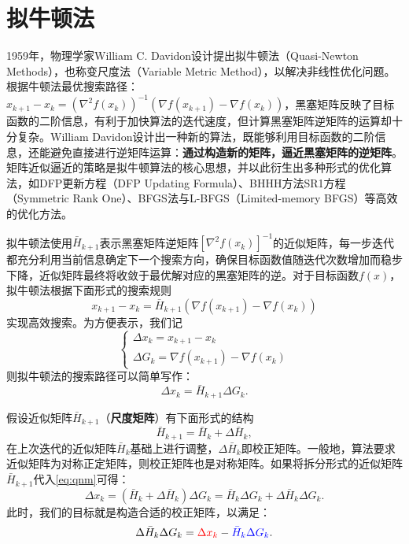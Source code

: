 \section{拟牛顿法}
1959年，物理学家William C. Davidon\cite{davidon1991variable}设计提出拟牛顿法（Quasi-Newton Methods），也称变尺度法（Variable Metric Method），以解决非线性优化问题。根据牛顿法最优搜索路径：$x_{k+1} - x_k = (\nabla^2 f(x_k))^{-1} (\nabla f(x_{k+1}) - \nabla f(x_k))$，黑塞矩阵反映了目标函数的二阶信息，有利于加快算法的迭代速度，但计算黑塞矩阵逆矩阵的运算却十分复杂。William Davidon\cite{davidon1991variable}设计出一种新的算法，既能够利用目标函数的二阶信息，还能避免直接进行逆矩阵运算：\textbf{通过构造新的矩阵，逼近黑塞矩阵的逆矩阵}。矩阵近似逼近的策略是拟牛顿算法的核心思想，并以此衍生出多种形式的优化算法，如DFP更新方程\cite{fletcher1963rapidly}（DFP Updating Formula）、BHHH方法SR1方程（Symmetric Rank One）、BFGS法与L-BFGS（Limited-memory BFGS）\cite{broyden1967quasi,fletcher1970new,goldfarb1970family,shanno1970conditioning}等高效的优化方法。

拟牛顿法使用$\bar{H}_{k+1}$表示黑塞矩阵逆矩阵$[\nabla^2 f(x_k)]^{-1}$的近似矩阵，每一步迭代都充分利用当前信息确定下一个搜索方向，确保目标函数值随迭代次数增加而稳步下降，近似矩阵最终将收敛于最优解对应的黑塞矩阵的逆。对于目标函数$f(x)$，拟牛顿法根据下面形式的搜索规则
\begin{equation}\label{eq:qnm}
    x_{k+1} - x_k = \bar{H}_{k+1} (\nabla f(x_{k+1}) - \nabla f(x_k))
\end{equation}
实现高效搜索。为方便表示，我们记
\begin{equation}
    \left\{
        \begin{array}{l}
          \Delta x_k = x_{k+1} - x_k \\
          \Delta G_k = \nabla f(x_{k+1}) - \nabla f(x_k)
        \end{array}
    \right.
\end{equation}
则拟牛顿法的搜索路径可以简单写作：
\begin{equation}
    \Delta x_k = \bar{H}_{k+1} \Delta G_k.
\end{equation}

假设近似矩阵$\bar{H}_{k+1}$（\textbf{尺度矩阵}）有下面形式的结构
\begin{equation}
    \bar{H}_{k+1} = \bar{H}_k + \Delta \bar{H}_k,
\end{equation}
在上次迭代的近似矩阵$\bar{H}_k$基础上进行调整，$\Delta \bar{H}_k$即校正矩阵。一般地，算法要求近似矩阵为对称正定矩阵，则校正矩阵也是对称矩阵。如果将拆分形式的近似矩阵$\bar{H}_{k+1}$代入\eqref{eq:qnm}可得：
\begin{equation}
    \Delta x_k = (\bar{H}_k + \Delta \bar{H}_k) \Delta G_k = \bar{H}_k \Delta G_k + \Delta \bar{H}_k \Delta G_k.
\end{equation}
此时，我们的目标就是构造合适的校正矩阵，以满足：
\begin{equation}
    \Delta \bar{H}_k \Delta G_k = \textcolor{red}{\Delta x_k} - \textcolor{blue}{\bar{H}_k \Delta G_k}.
\end{equation}

